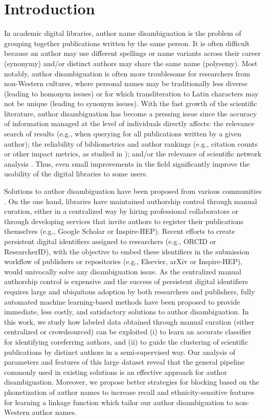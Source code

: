 \documentclass[runningheads,a4paper]{llncs}
\makeatletter
\newcommand*{\eg}{e.g.\@\xspace}
\makeatother
\begin{document}
\section{Introduction}
In academic digital libraries, author name disambiguation is the problem of
grouping together publications written by the same person.
It is often difficult because an author may use different
spellings or name variants across their career (synonymy) and/or distinct authors may
share the same name (polysemy).
Most notably, author disambiguation is often more troublesome for researchers
from non-Western cultures, where personal names may be traditionally less diverse (leading to
homonym issues) or for which transliteration to Latin characters may not be unique (leading to
synonym issues).
With the fast growth of the scientific literature, author disambiguation has become a pressing
issue since the accuracy of information managed at the level of individuals directly affects:
the relevance search of results (\eg, when querying for all publications written by a given author);
the reliability of bibliometrics and author rankings (\eg, citation counts or other impact
metrics, as studied in \cite{strotmann2012author}); and/or the relevance of scientific network analysis
\cite{newman2001structure}. Thus, even small improvements in the field significantly improve the usability of the digital libraries to some users.

Solutions to author disambiguation have been proposed from various
communities \cite{liu2014author}. On the one hand, libraries have maintained
authorship control through manual curation, either in a centralized way by
hiring professional collaborators or through developing services that invite authors to register
their publications themselves (\eg, Google Scholar or Inspire-HEP).
Recent efforts to create persistent digital identifiers assigned to researchers (\eg, ORCID or ResearcherID),
with the objective to embed these identifiers in the submission workflow of publishers
or repositories (\eg, Elsevier, arXiv or Inspire-HEP), would univocally solve any disambiguation issue.
As the centralized manual authorship control is expensive and the success of persistent digital
identifiers requires large and ubiquitous adoption by both researchers and publishers, fully
automated machine learning-based methods have been proposed to
provide immediate, less costly, and satisfactory solutions to author
disambiguation. In this work, we study how labeled data obtained through manual curation (either centralized or
crowdsourced) can be exploited (i) to learn an accurate classifier for
identifying coreferring authors, and (ii) to guide the clustering of scientific
publications by distinct authors in a semi-supervised way.
Our analysis of parameters and features of this large dataset reveal that the general pipeline
commonly used in existing solutions is an effective approach for author disambiguation.
Moreover, we propose better strategies for blocking based on the
phonetization of author names to increase recall and ethnicity-sensitive features for learning a
linkage function which tailor our author disambiguation to non-Western author names.
\end{document}
